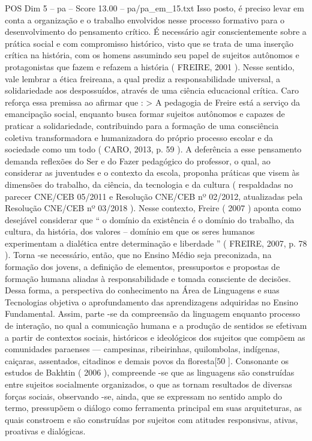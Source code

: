 \begin{textsample}{POS Dim 5 – pa – Score 13.00 – pa/pa\_em\_15.txt}
Isso posto, é preciso levar em conta a organização e o trabalho envolvidos nesse processo formativo para o desenvolvimento do pensamento crítico.
É necessário agir conscientemente sobre a prática social e com compromisso histórico, visto que se trata de uma inserção crítica na história, com os homens assumindo seu papel de sujeitos autônomos e protagonistas que fazem e refazem a história ( FREIRE, 2001 ).
Nesse sentido, vale lembrar a ética freireana, a qual prediz a responsabilidade universal, a solidariedade aos despossuídos, através de uma ciência educacional crítica.
Caro reforça essa premissa ao afirmar que : > A pedagogia de Freire está a serviço da emancipação social, enquanto busca formar sujeitos autônomos e capazes de praticar a solidariedade, contribuindo para a formação de uma consciência coletiva transformadora e humanizadora do próprio processo escolar e da sociedade como um todo ( CARO, 2013, p. 59 ).
A deferência a esse pensamento demanda reflexões do Ser e do Fazer pedagógico do professor, o qual, ao considerar as juventudes e o contexto da escola, proponha práticas que visem às dimensões do trabalho, da ciência, da tecnologia e da cultura ( respaldadas no parecer CNE/CEB 05/2011 e Resolução CNE/CEB nº 02/2012, atualizadas pela Resolução CNE/CEB nº 03/2018 ).
Nesse contexto, Freire ( 2007 ) aponta como desejável considerar que “ o domínio da existência é o domínio do trabalho, da cultura, da história, dos valores – domínio em que os seres humanos experimentam a dialética entre determinação e liberdade ” ( FREIRE, 2007, p. 78 ).
Torna -se necessário, então, que no Ensino Médio seja preconizada, na formação dos jovens, a definição de elementos, pressupostos e propostas de formação humana aliadas à responsabilidade e tomada consciente de decisões.
Dessa forma, a perspectiva do conhecimento na Área de Linguagens e suas Tecnologias objetiva o aprofundamento das aprendizagens adquiridas no Ensino Fundamental.
Assim, parte -se da compreensão da linguagem enquanto processo de interação, no qual a comunicação humana e a produção de sentidos se efetivam a partir de contextos sociais, históricos e ideológicos dos sujeitos que compõem as comunidades paraenses — campesinas, ribeirinhas, quilombolas, indígenas, caiçaras, assentados, citadinos e demais povos da floresta[50 ].
Consonante os estudos de Bakhtin ( 2006 ), compreende -se que as linguagens são construídas entre sujeitos socialmente organizados, o que as tornam resultados de diversas forças sociais, observando -se, ainda, que se expressam no sentido amplo do termo, pressupõem o diálogo como ferramenta principal em suas arquiteturas, as quais constroem e são construídas por sujeitos com atitudes responsivas, ativas, proativas e dialógicas.

\end{textsample}
